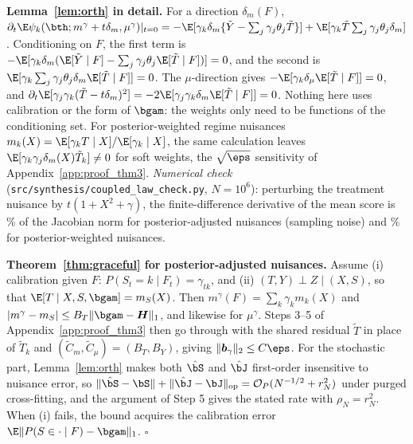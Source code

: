 \textbf{Lemma~\ref{lem:orth} in detail.} For a direction $\delta_m(F)$, $\partial_t\E\psi_k(\bth;m^\gamma+t\delta_m,\mu^\gamma)|_{t=0}=-\E[\gamma_k\delta_m\{\tilde Y-\textstyle\sum_j\gamma_j\theta_j\tilde T\}]+\E[\gamma_k\tilde T\textstyle\sum_j\gamma_j\theta_j\delta_m]$. Conditioning on $F$, the first term is $-\E[\gamma_k\delta_m(\E[\tilde Y\mid F]-\sum_j\gamma_j\theta_j\E[\tilde T\mid F])]=0$, and the second is $\E[\gamma_k\sum_j\gamma_j\theta_j\delta_m\E[\tilde T\mid F]]=0$. The $\mu$-direction gives $-\E[\gamma_k\delta_\mu\E[\tilde T\mid F]]=0$, and $\partial_t\E[\gamma_j\gamma_k(\tilde T-t\delta_m)^2]=-2\E[\gamma_j\gamma_k\delta_m\E[\tilde T\mid F]]=0$. Nothing here uses calibration or the form of $\bgam$: the weights only need to be functions of the conditioning set. For posterior-weighted regime nuisances $m_k(X)=\E[\gamma_kT\mid X]/\E[\gamma_k\mid X]$, the same calculation leaves $\E[\gamma_k\gamma_j\delta_m(X)\tilde T_k]\neq0$ for soft weights, the $\sqrt{\eps}$ sensitivity of Appendix~\ref{app:proof_thm3}.
\emph{Numerical check} (\texttt{src/synthesis/coupled\_law\_check.py}, $N=10^6$): perturbing the treatment nuisance by $t(1+X^2+\gamma)$, the finite-difference derivative of the mean score is \OrthPA\% of the Jacobian norm for posterior-adjusted nuisances (sampling noise) and \OrthW\% for posterior-weighted nuisances.

\textbf{Theorem~\ref{thm:graceful} for posterior-adjusted nuisances.} Assume (i) calibration given $F$: $P(S_t{=}k\mid F_t)=\gamma_{tk}$, and (ii) $(T,Y)\perp Z\mid(X,S)$, so that $\E[T\mid X,S,\bgam]=m_S(X)$. Then $m^\gamma(F)=\sum_k\gamma_km_k(X)$ and $|m^\gamma-m_S|\le B_T\|\bgam-\boldsymbol H\|_1$, and likewise for $\mu^\gamma$. Steps 3--5 of Appendix~\ref{app:proof_thm3} then go through with the shared residual $\tilde T$ in place of $\tilde T_k$ and $(\tilde C_m,\tilde C_\mu)=(B_T,B_Y)$, giving $\|\boldsymbol b_\gamma\|_2\le C\eps$. For the stochastic part, Lemma~\ref{lem:orth} makes both $\hat\bS$ and $\hat\bJ$ first-order insensitive to nuisance error, so $\|\hat\bS-\bS\|+\|\hat\bJ-\bJ\|_{\rm op}=\mathcal O_P(N^{-1/2}+r_N^2)$ under purged cross-fitting, and the argument of Step 5 gives the stated rate with $\rho_N=r_N^2$. When (i) fails, the bound acquires the calibration error $\E\|P(S\in\cdot\mid F)-\bgam\|_1$. $\square$

